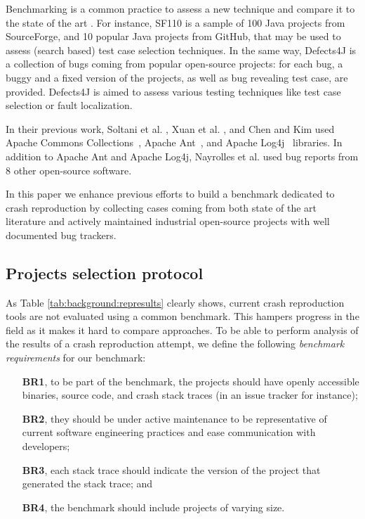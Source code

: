 
Benchmarking is a common practice to assess a new technique and compare it to the state of the art \cite{Sim2003}.
For instance, SF110 \cite{Fraser2014b} is a sample of 100 Java projects from SourceForge, and 10 popular Java projects from GitHub, that may be used to assess (search based) test case selection techniques.
In the same way, Defects4J \cite{just2014defects4j} is a collection of bugs coming from popular open-source projects: for each bug, a buggy and a fixed version of the projects, as well as bug revealing test case, are provided. Defects4J is aimed to assess various testing techniques like test case selection or fault localization.

In their previous work, Soltani et al. \cite{soltani2017}, Xuan et al. \cite{Xuan2015}, and Chen and Kim \cite{Chen2015} used Apache Commons Collections~\cite{commonscollections}, Apache Ant~\cite{ant}, and Apache Log4j~\cite{log4j} libraries.
In addition to  Apache Ant and Apache Log4j, Nayrolles et al. \cite{Nayrolles2017} used bug reports from 8 other open-source software.

In this paper we enhance previous efforts to build a benchmark dedicated to crash reproduction by collecting cases coming from both state of the art literature and actively maintained industrial open-source projects with well documented bug trackers.

\subsection{Projects selection protocol}

As Table \ref{tab:background:represults} clearly shows, current crash reproduction tools are not evaluated using a common benchmark.
This hampers progress in the field as it makes it hard to compare approaches.
To be able to perform analysis of the results of a crash reproduction attempt, we define the following \emph{benchmark requirements} for our benchmark:
\begin{itemize}
\item[ \textbf{BR1},] to be part of the benchmark, the projects should have openly accessible binaries, source code, and crash stack traces (in an issue tracker for instance);
\item[ \textbf{BR2},] they should be under active maintenance to be representative of current software engineering practices and ease communication with developers;
\item[ \textbf{BR3},] each stack trace should indicate the version of the project that generated the stack trace; and
\item[ \textbf{BR4},] the benchmark should include projects of varying size.
\end{itemize}

